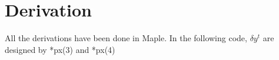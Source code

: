 \documentclass[letterpaper,12pt]{article}
\begin{document}

\newpage
\section*{Derivation}
All the derivations have been done in Maple. In the following code, $\delta y^t$ are designed by *px(3) and *px(4)

\end{document}
